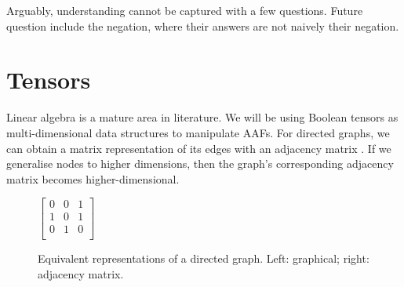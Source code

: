 Arguably, understanding cannot be captured with a few questions. Future question include the negation, where their answers are not naively their negation.

\section{Tensors}

Linear algebra is a mature area in literature. We will be using Boolean tensors as multi-dimensional data structures to manipulate AAFs. For directed graphs, we can obtain a matrix representation of its edges with an adjacency matrix \cite{adjmat}. If we generalise nodes to higher dimensions, then the graph's corresponding adjacency matrix becomes higher-dimensional.
\begin{figure}[H]
	\begin{center}
		\begin{minipage}{0.3\textwidth}
			\begin{center}
			\end{center}
		\end{minipage}
		\begin{minipage}{0.3\textwidth}
			\begin{center}
			$\begin{bmatrix}
			0&0&1\\
			1&0&1\\
			0&1&0\\
			\end{bmatrix}$
			\end{center}
		\end{minipage}
		
			
	\end{center}
	\caption{Equivalent representations of a directed graph. Left: graphical; right: adjacency matrix.}
\end{figure}
